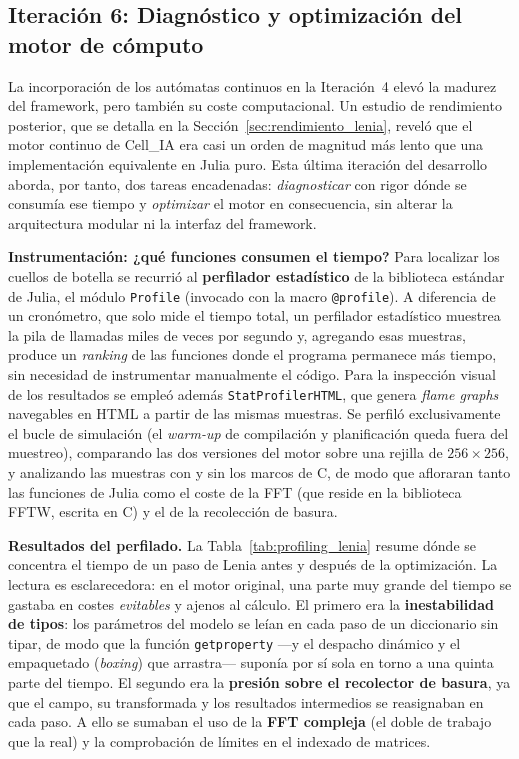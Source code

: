 \documentclass[runningheads]{llncs}
\begin{document}
\subsection{Iteración 6: Diagnóstico y optimización del motor de cómputo}
\label{sec:iteracion6}
La incorporación de los autómatas continuos en la Iteración~4 elevó la madurez
del framework, pero también su coste computacional. Un estudio de rendimiento
posterior, que se detalla en la Sección~\ref{sec:rendimiento_lenia}, reveló que
el motor continuo de Cell\_IA era casi un orden de magnitud más lento que una
implementación equivalente en Julia puro. Esta última iteración del desarrollo aborda, por tanto, dos
tareas encadenadas: \emph{diagnosticar} con rigor dónde se consumía ese tiempo y
\emph{optimizar} el motor en consecuencia, sin alterar la arquitectura modular
ni la interfaz del framework.

\textbf{Instrumentación: ¿qué funciones consumen el tiempo?}
Para localizar los cuellos de botella se recurrió al \textbf{perfilador
estadístico} de la biblioteca estándar de Julia, el módulo \texttt{Profile}
(invocado con la macro \texttt{@profile}). A diferencia de un cronómetro, que
solo mide el tiempo total, un perfilador estadístico muestrea la pila de
llamadas miles de veces por segundo y, agregando esas muestras, produce un
\textit{ranking} de las funciones donde el programa permanece más tiempo, sin
necesidad de instrumentar manualmente el código. Para la inspección visual de
los resultados se empleó además \texttt{StatProfilerHTML}, que genera
\textit{flame graphs} navegables en HTML a partir de las mismas muestras. Se
perfiló exclusivamente el bucle de simulación (el \textit{warm-up} de compilación
y planificación queda fuera del muestreo), comparando las dos versiones del motor
sobre una rejilla de $256\times256$, y analizando las muestras con y sin los
marcos de C, de modo que afloraran tanto las funciones de Julia como el coste de
la FFT (que reside en la biblioteca FFTW, escrita en C) y el de la recolección de
basura.

\textbf{Resultados del perfilado.}
La Tabla~\ref{tab:profiling_lenia} resume dónde se concentra el tiempo de un paso
de Lenia antes y después de la optimización. La lectura es esclarecedora: en el
motor original, una parte muy grande del tiempo se gastaba en costes
\emph{evitables} y ajenos al cálculo. El primero era la \textbf{inestabilidad de
tipos}: los parámetros del modelo se leían en cada paso de un diccionario sin
tipar, de modo que la función \texttt{getproperty} —y el despacho dinámico y el
empaquetado (\textit{boxing}) que arrastra— suponía por sí sola en torno a una
quinta parte del tiempo. El segundo era la \textbf{presión sobre el recolector de
basura}, ya que el campo, su transformada y los resultados intermedios se
reasignaban en cada paso. A ello se sumaban el uso de la \textbf{FFT compleja}
(el doble de trabajo que la real) y la comprobación de límites en el indexado de
matrices.
\end{document}
